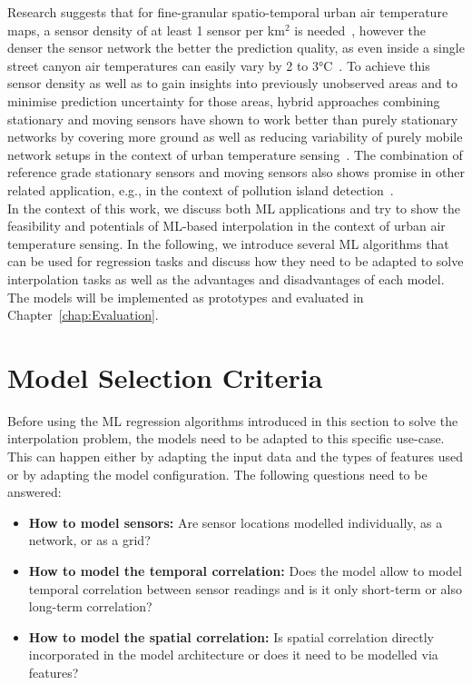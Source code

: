 Research suggests that for fine-granular spatio-temporal urban air temperature maps, a sensor density of at least 1 sensor per km$^{2}$ is needed~\cite{venter2020hyperlocal}, however the denser the sensor network the better the prediction quality, as even inside a single street canyon air temperatures can easily vary by 2 to 3°C~\cite{sugawara2008temperature}.
To achieve this sensor density as well as to gain insights into previously unobserved areas and to minimise prediction uncertainty for those areas, hybrid approaches combining stationary and moving sensors have shown to work better than purely stationary networks by covering more ground as well as reducing variability of purely mobile network setups in the context of urban temperature sensing~\cite{yang2019designing}. The combination of reference grade stationary sensors and moving sensors also shows promise in other related application, e.g., in the context of pollution island detection~\cite{iyer2022modeling}.\\
In the context of this work, we discuss both ML applications and try to show the feasibility and potentials of ML-based interpolation in the context of urban air temperature sensing.
In the following, we introduce several ML algorithms that can be used for regression tasks and discuss how they need to be adapted to solve interpolation tasks as well as the advantages and disadvantages of each model. The models will be implemented as prototypes and evaluated in Chapter~\ref{chap:Evaluation}.

\section{Model Selection Criteria}
\label{sec: model selection criteria}

Before using the ML regression algorithms introduced in this section to solve the interpolation problem, the models need to be adapted to this specific use-case. This can happen either by adapting the input data and the types of features used or by adapting the model configuration. The following questions need to be answered:

\begin{itemize}
    \item \textbf{How to model sensors:} Are sensor locations modelled individually, as a network, or as a grid?
    \item \textbf{How to model the temporal correlation:} Does the model allow to model temporal correlation between sensor readings and is it only short-term or also long-term correlation?
    \item \textbf{How to model the spatial correlation:} Is spatial correlation directly incorporated in the model architecture or does it need to be modelled via features?
\end{itemize}

